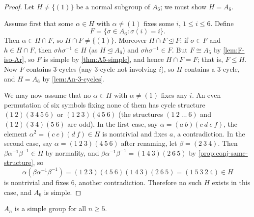 \begin{proof}
	Let \(H \neq \{(1)\}\) be a normal subgroup of \(A_6\); we must show \(H = A_6\).

	Assume first that some \(\alpha \in H\) with \(\alpha \neq (1)\) fixes some \(i\),
	\(1 \leq i \leq 6\). Define
	\[
		F = \{\sigma \in A_6 : \sigma(i) = i\}.
	\]
	Then \(\alpha \in H \cap F\), so \(H \cap F \neq \{(1)\}\). Moreover
	\(H \cap F \trianglelefteq F\): if \(\sigma \in F\) and \(h \in H \cap F\), then
	\(\sigma h\sigma^{-1} \in H\) (as \(H \trianglelefteq A_6\)) and
	\(\sigma h\sigma^{-1} \in F\). But \(F \cong A_5\) by \autoref{lem:F-iso-Ar}, so \(F\)
	is simple by \autoref{thm:A5-simple}, and hence \(H \cap F = F\); that is,
	\(F \leq H\). Now \(F\) contains \(3\)-cycles (any \(3\)-cycle not involving \(i\)), so
	\(H\) contains a \(3\)-cycle, and \(H = A_6\) by \autoref{lem:An-3-cycles}.

	We may now assume that no \(\alpha \in H\) with \(\alpha \neq (1)\) fixes any \(i\).
	An even permutation of six symbols fixing none of them has cycle structure
	\((1\ 2)(3\ 4\ 5\ 6)\) or \((1\ 2\ 3)(4\ 5\ 6)\) (the structures \((1\ 2\ \dots\ 6)\)
	and \((1\ 2)(3\ 4)(5\ 6)\) are odd). In the first case, say
	\(\alpha = (a\ b)(c\ d\ e\ f)\), the element
	\(\alpha^2 = (c\ e)(d\ f) \in H\) is nontrivial and fixes \(a\), a contradiction. In
	the second case, say \(\alpha = (1\ 2\ 3)(4\ 5\ 6)\) after renaming, let
	\(\beta = (2\ 3\ 4)\). Then \(\beta\alpha^{-1}\beta^{-1} \in H\) by normality, and
	\(\beta\alpha^{-1}\beta^{-1} = (1\ 4\ 3)(2\ 6\ 5)\) by
	\autoref{prop:conj-same-structure}, so
	\[
		\alpha(\beta\alpha^{-1}\beta^{-1}) = (1\ 2\ 3)(4\ 5\ 6)(1\ 4\ 3)(2\ 6\ 5)
		= (1\ 5\ 3\ 2\ 4) \in H
	\]
	is nontrivial and fixes \(6\), another contradiction. Therefore no such \(H\) exists
	in this case, and \(A_6\) is simple.
\end{proof}

\begin{theorem}\label{thm:An-simple}
	\(A_n\) is a simple group for all \(n \geq 5\).
\end{theorem}

